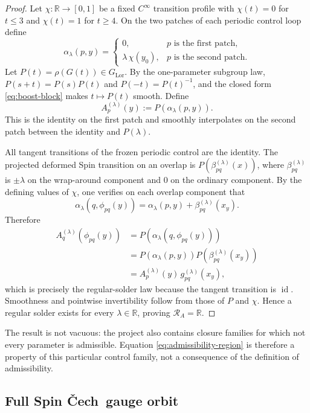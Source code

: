\documentclass[11pt,a4paper]{article}
\theoremstyle{definition}
\theoremstyle{remark}
\newcommand{\R}{\mathbb{R}}
\newcommand{\LorG}{G_{\mathrm{Lor}}}
\newcommand{\id}{\operatorname{id}}
\newcommand{\Cech}{\ifmmode\text{\v{C}ech}\else\v{C}ech\fi}
\newcommand{\cR}{\mathcal{R}}
\begin{document}
\begin{proof}
Let \(\chi:\R\to[0,1]\) be a fixed \(C^\infty\) transition profile with
\(\chi(t)=0\) for \(t\le3\) and \(\chi(t)=1\) for \(t\ge4\).  On the two
patches of each periodic control loop define
\[
  \alpha_\lambda(p,y)=
  \begin{cases}
     0, & p\text{ is the first patch},\\
     \lambda\,\chi(y_0), & p\text{ is the second patch}.
  \end{cases}
\tag{11.6a}\label{eq:solder-angle}
\]
Let \(P(t)=\rho(G(t))\in\LorG\).  By the one-parameter subgroup law,
\(P(s+t)=P(s)P(t)\) and \(P(-t)=P(t)^{-1}\), and the closed form
\eqref{eq:boost-block} makes \(t\mapsto P(t)\) smooth.  Define
\[
   A_p^{(\lambda)}(y):=P(\alpha_\lambda(p,y)).
\tag{11.6b}\label{eq:explicit-solder}
\]
This is the identity on the first patch and smoothly interpolates on the
second patch between the identity and \(P(\lambda)\).

All tangent transitions of the frozen periodic control are the identity.
The projected deformed Spin transition on an overlap is
\(P(\beta_{pq}^{(\lambda)}(x))\), where
\(\beta_{pq}^{(\lambda)}\) is \(\pm\lambda\) on the wrap-around component
and \(0\) on the ordinary component.  By the defining values of \(\chi\),
one verifies on each overlap component that
\[
   \alpha_\lambda(q,\phi_{pq}(y))
   =\alpha_\lambda(p,y)+\beta_{pq}^{(\lambda)}(x_y).
\tag{11.6c}\label{eq:solder-angle-step}
\]
Therefore
\[
\begin{aligned}
  A_q^{(\lambda)}(\phi_{pq}(y))
   &=P(\alpha_\lambda(q,\phi_{pq}(y)))\\
   &=P(\alpha_\lambda(p,y))
     P(\beta_{pq}^{(\lambda)}(x_y))\\
   &=A_p^{(\lambda)}(y)\,g_{pq}^{(\lambda)}(x_y),
\end{aligned}
\]
which is precisely the regular-solder law because the tangent transition is
\(\id\).  Smoothness and pointwise invertibility follow from those of
\(P\) and \(\chi\).  Hence a regular solder exists for every
\(\lambda\in\R\), proving \(\cR_A=\R\).
\end{proof}

The result is not vacuous: the project also contains closure families for
which not every parameter is admissible.  Equation \eqref{eq:admissibility-region} is
therefore a property of this particular control family, not a consequence
of the definition of admissibility.

\subsection{Full Spin \Cech\ gauge orbit}
\end{document}
